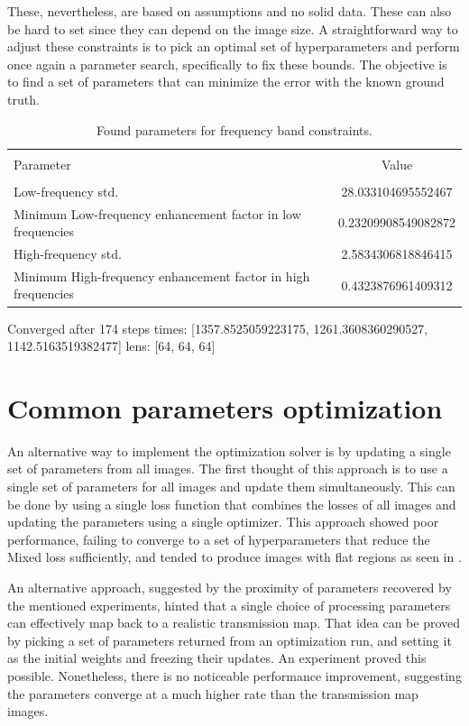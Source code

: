 \documentclass[nomenclature, english, bibtex]{kththesis}
\numberwithin{listing}{chapter}
\begin{document}
These, nevertheless, are based on assumptions and no solid data. These can also be hard to set since they can depend on the image size.
A straightforward way to adjust these constraints is to pick an optimal set of hyperparameters and perform once again
a parameter search, specifically to fix these bounds. The objective is to find a set of parameters that can
minimize the error with the known ground truth.

\begin{table}[H]
\centering
\begin{tabular}{ | l | c| }
\hline \\
Parameter & Value \\
\hline \\
Low-frequency std. & 28.033104695552467 \\
Minimum Low-frequency enhancement factor in low frequencies & 0.23209908549082872 \\
High-frequency std. & 2.5834306818846415 \\
Minimum High-frequency enhancement factor in high frequencies & 0.4323876961409312 \\
\hline
\end{tabular}
\caption{Found parameters for frequency band constraints.}
\end{table}

Converged after 174 steps
times:  [1357.8525059223175, 1261.3608360290527, 1142.5163519382477]
lens:  [64, 64, 64]

\section{Common parameters optimization}

An alternative way to implement the optimization solver is by updating a single set of parameters from all images.
The first thought of this approach is to use a single set of parameters for all images and update them simultaneously.
This can be done by using a single loss function that combines the losses of all images and updating the parameters
using a single optimizer. This approach showed poor performance, failing to converge to a set of hyperparameters
that reduce the Mixed loss sufficiently, and tended to produce images with flat regions as seen in .

An alternative approach, suggested by the proximity of parameters recovered by the mentioned experiments, hinted that a single choice of processing parameters can effectively map back to a realistic transmission map. That idea can be proved by picking a set of parameters returned from an optimization run, and setting it as the initial weights and freezing their updates. An experiment proved this possible. Nonetheless, there is no noticeable performance improvement, suggesting the parameters converge at a much higher rate than the transmission map images.   
\end{document}
